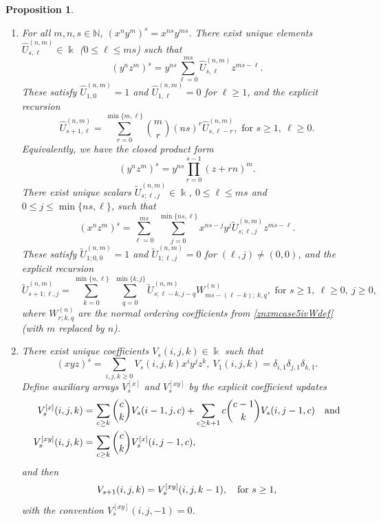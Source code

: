 \documentclass{amsart}
\newtheorem{proposition}[theorem]{Proposition}
\theoremstyle{definition}
\theoremstyle{remark}
\numberwithin{equation}{section}
\begin{document}
\begin{proposition}
\begin{enumerate}
\item [\rm (2)] For all $m,n,s\in\mathbb N$, $\left(x^n y^m\right)^s = x^{ns}y^{ms}$. There exist unique elements $\widehat U^{(n,m)}_{s,\ell}\in\Bbbk$ {\rm (}$0\le \ell\le ms${\rm )} such that
\begin{equation}\label{Uhatdefcase5iv}
(y^n z^m)^s= y^{ns}\sum_{\ell=0}^{ms}\widehat U^{(n,m)}_{s,\ell} z^{ ms-\ell}.
\end{equation}
These satisfy $\widehat U^{(n,m)}_{1,0}=1$ and $\widehat U^{(n,m)}_{1,\ell}=0$ for $\ell\ge 1$, and the explicit recursion
\begin{equation}\label{Uhatreccase5iv}
\widehat U^{(n,m)}_{s+1,\ell} =\sum_{r=0}^{\min\{m,\ell\}}
\binom{m}{r}(ns)^{r} \widehat U^{(n,m)}_{s,\ell-r}, \text{ for } s\ge 1,\ \ell\ge 0.
\end{equation}
Equivalently, we have the closed product form
\begin{equation}\label{Uhatproductcase5iv}
\left(y^n z^m\right)^s = y^{ns}\prod_{r=0}^{s-1}(z+rn)^{m}.
\end{equation}
There exist unique scalars $\widetilde U^{(n,m)}_{s;\ell,j}\in\Bbbk$,
$0\le \ell\le ms$ and $0\le j\le \min\{ns,\ell\}$, such that
\begin{equation}\label{Utildedefcase5iv}
(x^n z^m)^s=\sum_{\ell=0}^{ms}\ \sum_{j=0}^{\min\{ns,\ell\}}
x^{ns-j}y^{j} \widetilde U^{(n,m)}_{s;\ell,j} z^{ ms-\ell}.
\end{equation}
These satisfy $\widetilde U^{(n,m)}_{1;0,0}=1$ and $\widetilde U^{(n,m)}_{1;\ell,j}=0$ for $(\ell,j)\neq(0,0)$, and the explicit recursion
\begin{equation}\label{Utildereccase5iv}
\widetilde U^{(n,m)}_{s+1;\ell,j} = \sum_{k=0}^{\min\{n,\ell\}}
\ \sum_{q=0}^{\min\{k,j\}} \widetilde U^{(n,m)}_{s;\ell-k, j-q} 
W^{(n)}_{ ms-(\ell-k);\ k,q}, \text{ for } s\ge 1,\ \ell\ge 0,\ j\ge 0,
\end{equation}
where $W^{(n)}_{r;k,q}$ are the normal ordering coefficients from \eqref{znxmcase5ivWdef} {\rm (}with $m$ replaced by $n${\rm )}.

\item [\rm (3)] There exist unique coefficients $V_s(i,j,k)\in\Bbbk$ such that
\begin{equation}\label{Vdefcase5iv}
(xyz)^s=\sum_{i,j,k\ge 0}V_s(i,j,k) x^i y^j z^k, \ V_1(i,j,k)=\delta_{i,1}\delta_{j,1}\delta_{k,1}.
\end{equation}
Define auxiliary arrays $V^{[x]}_s$ and $V^{[xy]}_s$ by the explicit coefficient updates
\begin{align}
V^{[x]}_s(i,j,k) = &\, \sum_{c\ge k}\binom{c}{k} V_s(i-1,j,c) + \sum_{c\ge k+1}c\binom{c-1}{k} V_s(i,j-1,c) \quad {\rm and}  \label{Vmultxcase5iv} \\
V^{[xy]}_s(i,j,k) = &\, \sum_{c\ge k}\binom{c}{k} V^{[x]}_s(i,j-1,c), \label{Vmultycase5iv}
\end{align}
and then
\begin{equation}\label{Vreccase5iv}
V_{s+1}(i,j,k)=V^{[xy]}_s(i,j,k-1), \quad {\rm for}\, \, s\ge 1,
\end{equation}
with the convention $V^{[xy]}_s(i,j,-1)=0$.


\end{enumerate}
\end{proposition}
\end{document}
